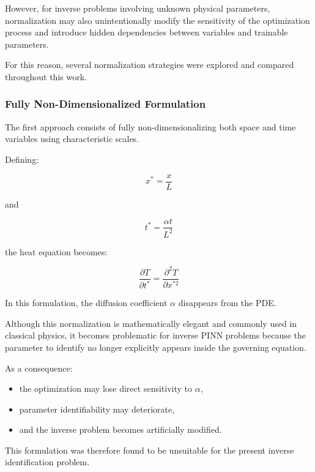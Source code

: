 However, for inverse problems involving unknown physical parameters, normalization may also unintentionally modify the sensitivity of the optimization process and introduce hidden dependencies between variables and trainable parameters.

For this reason, several normalization strategies were explored and compared throughout this work.

\subsubsection{Fully Non-Dimensionalized Formulation}

The first approach consists of fully non-dimensionalizing both space and time variables using characteristic scales.

Defining:

\begin{equation}
x^*=\frac{x}{L}
\end{equation}

and

\begin{equation}
t^*=\frac{\alpha t}{L^2}
\end{equation}

the heat equation becomes:

\begin{equation}
\frac{\partial T}{\partial t^*}
=
\frac{\partial^2 T}{\partial x^{*2}}
\end{equation}

In this formulation, the diffusion coefficient $\alpha$ disappears from the PDE.

Although this normalization is mathematically elegant and commonly used in classical physics, it becomes problematic for inverse PINN problems because the parameter to identify no longer explicitly appears inside the governing equation.

As a consequence:
\begin{itemize}
    \item the optimization may lose direct sensitivity to $\alpha$,
    \item parameter identifiability may deteriorate,
    \item and the inverse problem becomes artificially modified.
\end{itemize}

This formulation was therefore found to be unsuitable for the present inverse identification problem.

